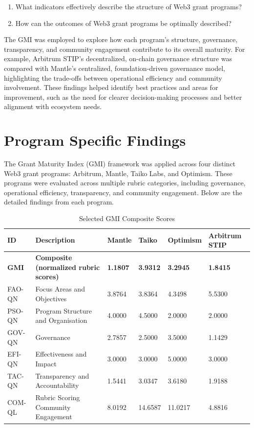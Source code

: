 \documentclass[a4,10pt]{article}
\begin{document}
\begin{enumerate}
    \item What indicators effectively describe the structure of Web3 grant programs?
    \item How can the outcomes of Web3 grant programs be optimally described?
\end{enumerate}

The GMI was employed to explore how each program’s structure, governance, transparency, and community engagement contribute to its overall maturity. For example, Arbitrum STIP's decentralized, on-chain governance structure was compared with Mantle’s centralized, foundation-driven governance model, highlighting the trade-offs between operational efficiency and community involvement. These findings helped identify best practices and areas for improvement, such as the need for clearer decision-making processes and better alignment with ecosystem needs.

\section{Program Specific Findings}\label{sec_8}
The Grant Maturity Index (GMI) framework was applied across four distinct Web3 grant programs: Arbitrum, Mantle, Taiko Labs, and Optimism. These programs were evaluated across multiple rubric categories, including governance, operational efficiency, transparency, and community engagement. Below are the detailed findings from each program.

\begin{table}[h!]
\centering
\begin{tabular}{l|l|l|l|l|l}

\textbf{ID} & \textbf{Description} & \textbf{Mantle} & \textbf{Taiko} & \textbf{Optimism} & \textbf{Arbitrum STIP} \\ \hline
\textbf{GMI} & \textbf{Composite (normalized rubric scores)} & \textbf{1.1807} & \textbf{3.9312} & \textbf{3.2945} & \textbf{1.8415} \\ \hline
FAO-QN & Focus Areas and Objectives & 3.8764 & 3.8364 & 4.3498 & 5.5300 \\ \hline
PSO-QN & Program Structure and Organisation & 4.0000 & 4.5000 & 2.0000 & 2.0000 \\ \hline
GOV-QN & Governance & 2.7857 & 2.5000 & 3.5000 & 1.1429 \\ \hline
EFI-QN & Effectiveness and Impact & 3.0000 & 3.0000 & 5.0000 & 3.0000 \\ \hline
TAC-QN & Transparency and Accountability & 1.5441 & 3.0347 & 3.6180 & 1.9188 \\ \hline
COM-QL & Rubric Scoring Community Engagement & 8.0192 & 14.6587 & 11.0217 & 4.8816 \\
\end{tabular}
\caption{Selected GMI Composite Scores}
\label{Table:2}
\end{table}
\end{document}
